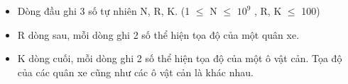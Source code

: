 \begin{itemize}
	\item     Dòng đầu ghi 3 số tự nhiên N, R, K. (1  $\le$  N  $\le$  $10^{9}$    , R, K  $\le$  100)   
	\item     R dòng sau, mỗi dòng ghi 2 số thể hiện tọa độ của một quân xe.   
	\item     K dòng cuối, mỗi dòng ghi 2 số thể hiện tọa độ của một ô vật cản. Tọa độ của các quân xe cũng như các ô vật cản là khác nhau.   
\end{itemize}